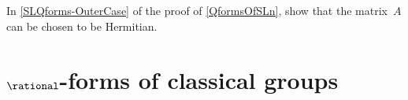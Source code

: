 \begin{corrections}
\begin{enumerate}
\end{enumerate}
\end{corrections}



\begin{exercises}

\item \label{SLQforms-OuterCase-AHermEx}
In \cref{SLQforms-OuterCase} of the proof of \cref{QformsOfSLn}, show that the matrix~$A$ can be chosen to be Hermitian.

\end{exercises}












\section{\texorpdfstring{$\rational$}{Q}-forms of classical groups}
\label{QFormClassicalSect}

